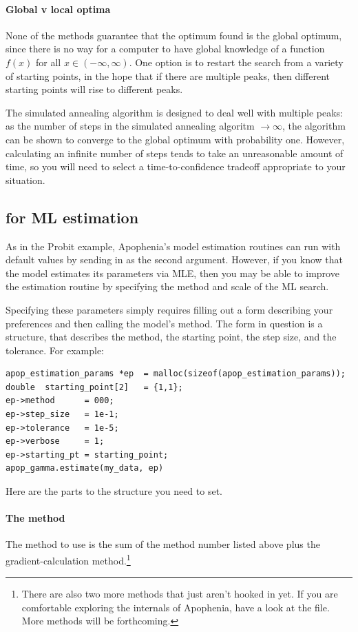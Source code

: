 \paragraph{Global v local optima}
None of the methods guarantee that the optimum found is the global
optimum, since there is no way for a computer to have global knowledge
of a function $f(x)$ for all $x \in (-\infty, \infty)$. One option is
to restart the search from a variety of starting points, in the hope
that if there are multiple peaks, then different starting points will
rise to different peaks.

The simulated annealing algorithm is designed to deal well with multiple
peaks: as the number of steps in the simulated annealing algoritm $\to
\infty$, the algorithm can be shown to converge to the global optimum
with probability one. However, calculating an infinite number of steps
tends to take an unreasonable amount of time, so you will need to select
a time-to-confidence tradeoff appropriate to your situation.


\subsection{ for ML estimation}
As in the Probit example, Apophenia's model estimation routines can run
with default values by sending in  as the second
argument. However, if you know that the model estimates its parameters
via MLE, then you may be able to improve the estimation routine by
specifying the method and scale of the ML search.

Specifying these parameters simply requires 
filling out a form describing your preferences and then calling the model's  method.
The form in question is a  structure, that
describes the method, the starting point, the step size, and the
tolerance.
For example:
\begin{lstlisting}
apop_estimation_params *ep  = malloc(sizeof(apop_estimation_params));
double  starting_point[2]   = {1,1};
ep->method      = 000;
ep->step_size   = 1e-1;
ep->tolerance   = 1e-5;
ep->verbose     = 1;
ep->starting_pt = starting_point;
apop_gamma.estimate(my_data, ep)
\end{lstlisting}

Here are the parts to the  
structure you need to set. 

\paragraph{The method} The method to use is the sum of the method number
listed above plus the gradient-calculation method.\footnote{There are also two more methods that just aren't hooked in yet. If you
are comfortable exploring the internals of Apophenia, have a look at
the  file. More methods will be forthcoming.}

